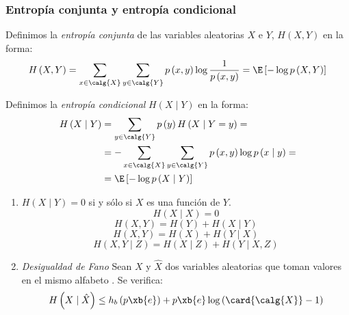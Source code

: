 \begin{Resumen}
\subsubsection*{Entropía conjunta y entropía condicional}
Definimos la \emph{entropía conjunta} de las variables aleatorias $X$ e $Y$, $H\left( {X,Y} \right)$ en la forma:
\begin{equation*}
H\left( {X,Y} \right)=\sum_{x\in \calg{X} }{\sum_{y\in \calg{Y}}{p\left( {x,y} \right)\log \frac{1}{p\left( {x,y} \right)}}}=\E\left[ {-\log p\left( {X,Y} \right)} \right]
\end{equation*}

Definimos la \emph{entropía condicional} $H\left( {X \mid Y} \right)$ en la forma:
\begin{align*}
H\left( {X \mid Y} \right)&=\sum_{y\in \calg{Y}}{p\left( {y} \right)H\left( {X \mid Y= y} \right)}=  \\
&=-\sum_{x\in \calg{X}}{\sum_{y\in \calg{Y}}{p\left( {x,y} \right) \log p\left( {x \mid  y} \right)}}= \\
&=\E\left[ {-\log p\left( {X\mid Y} \right)} \right]
\end{align*}

\begin{enumerate}
\itemv[10]
\begin{equation*}
H\left( {X,Y} \right) \le H\left( {X} \right)+ H\left( {Y} \right)
\end{equation*}
con la igualdad si y sólo si $X$ e $Y$ son estadísticamente independientes.
\itemv[10]
\begin{align*}
H\left( {X\mid Y} \right) &\le H\left( {X} \right) \\
H\left( {Y\mid X} \right) &\le H\left( {Y} \right)
\end{align*}
con la igualdad si y sólo si $X$ e $Y$ son estadísticamente independientes.
\item $H\left( {X\mid Y} \right)=0$ si y sólo si $X$ es una función de $Y$.
\itemv[10]
\begin{equation*}
H\left( {X \mid X} \right) =0
\end{equation*}
\itemv[10] 
\begin{equation*}
H\left( {X,Y} \right)=H\left( {Y} \right)+H\left( {X\mid Y} \right)
\end{equation*}
\itemv[10] 
\begin{equation*}
H\left( {X,Y} \right)=H\left( {X} \right)+H\left( {Y\mid X} \right)
\end{equation*}
\itemv[10] 
\begin{equation*}
H\left( {X,Y \mid Z} \right)=H\left( {X\mid Z} \right)+H\left( {Y\mid X,Z} \right)
\end{equation*}
\item \emph{Desigualdad de Fano} Sean $X$ y $\hat{X}$ dos variables aleatorias que toman valores en el mismo alfabeto . Se verifica:
\begin{equation*}
H\left( {X\mid \hat{X}} \right) \le h_{b}\left( {p\xb{e}} \right)+p\xb{e}\log \left( {\card{\calg{X}}-1} \right)
\end{equation*}
\end{enumerate}
%

\end{Resumen}
